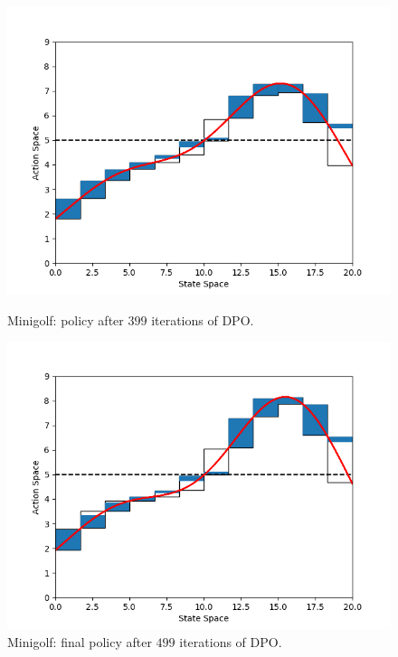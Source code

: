 \begin{figure}[h!]
	\centering
	\begin{minipage}[t]{.48\columnwidth}
		\includegraphics[width=\textwidth]{plots/it399.png}
		\caption{Minigolf: policy after $399$ iterations of \ac{DPO}.}
		\label{fig:mg399}
	\end{minipage}%
	\hfill
	\begin{minipage}[t]{.48\columnwidth}
		\includegraphics[width=\textwidth]{plots/it499.png}
		\caption{Minigolf: final policy after $499$ iterations of \ac{DPO}.}
		\label{fig:mg499}
	\end{minipage}
\end{figure}